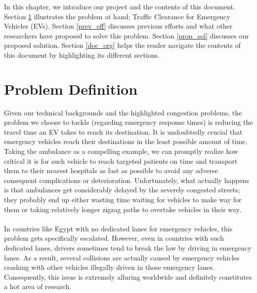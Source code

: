 \label{intro_chapter}

In this chapter, we introduce our project and the contents of this document. Section \ref{problem_def} illustrates the problem at hand; Traffic Clearance for Emergency Vehicles (EVs). Section \ref{prev_eff} discusses previous efforts and what other researchers have proposed to solve this problem. Section \ref{prop_sol} discusses our proposed solution. Section \ref{doc_org} helps the reader navigate the contents of this document by highlighting its different sections.



\section{Problem Definition}
\label{problem_def}
Given our technical backgrounds and the highlighted congestion problems, the problem we choose to tackle (regarding emergency response times) is reducing the travel time an EV takes to reach its destination. It is undoubtedly crucial that emergency vehicles reach their destinations in the least possible amount of time. Taking the ambulance as a compelling example, we can promptly realize how critical it is for such vehicle to reach targeted patients on time and transport them to their nearest hospitals as fast as possible to avoid any adverse consequent complications or deterioration. Unfortunately, what actually happens is that ambulances get considerably delayed by the severely congested streets; they probably end up either wasting time waiting for vehicles to make way for them or taking relatively longer zigzag paths to overtake vehicles in their way. \\ \\
In countries like Egypt with no dedicated lanes for emergency vehicles, this problem gets specifically escalated. However, even in countries with such dedicated lanes, drivers sometimes tend to break the law by driving in emergency lanes. As a result, several collisions are actually caused by emergency vehicles crashing with other vehicles illegally driven in those emergency lanes. Consequently, this issue is extremely alluring worldwide and definitely constitutes a hot area of research.

